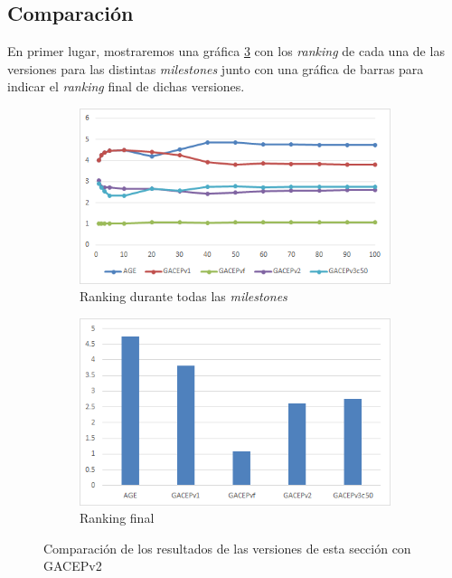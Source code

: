 \subsection{Comparación}

En primer lugar, mostraremos una gráfica \ref{fig:Final} con los \textit{ranking} de cada una de las versiones para las distintas \textit{milestones} junto con una gráfica de barras para indicar el \textit{ranking} final de dichas versiones.  

\begin{figure}[h]
     \centering
     \begin{subfigure}[b]{0.45\textwidth}
         \centering
         \includegraphics[width=\textwidth]{imagenes/Experimental/Final.png}
         \caption{Ranking durante todas las \textit{milestones}}
         \label{fig:Final_lineas}
     \end{subfigure}
     \hfill
     \begin{subfigure}[b]{0.45\textwidth}
         \centering
         \includegraphics[width=\textwidth]{imagenes/Experimental/barras/Final.png}
         \caption{Ranking final}
         \label{fig:Final_barras}
     \end{subfigure}
        \caption{Comparación de los resultados de las versiones de esta sección con GACEPv2}
        \label{fig:Final}
\end{figure}

